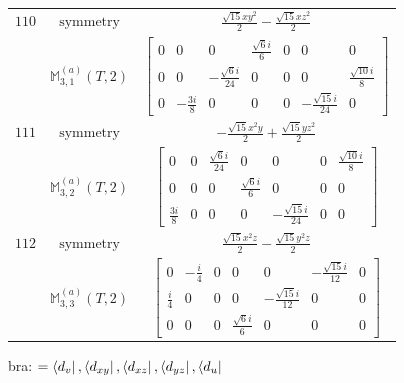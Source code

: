 \documentclass[fleqn,8pt,landscape]{jsarticle}
\begin{document}
\begin{longtable}{ccc}
$ 110 $ & $ \text{symmetry} $ & $ \frac{\sqrt{15} x y^{2}}{2} - \frac{\sqrt{15} x z^{2}}{2} $ \\
$  $ & $ \mathbb{M}_{3,1}^{(a)}(T,2) $ & $ \begin{bmatrix} 0 & 0 & 0 & \frac{\sqrt{6} i}{6} & 0 & 0 & 0 \\ 0 & 0 & - \frac{\sqrt{6} i}{24} & 0 & 0 & 0 & \frac{\sqrt{10} i}{8} \\ 0 & - \frac{3 i}{8} & 0 & 0 & 0 & - \frac{\sqrt{15} i}{24} & 0 \end{bmatrix} $ \\ \hline
$ 111 $ & $ \text{symmetry} $ & $ - \frac{\sqrt{15} x^{2} y}{2} + \frac{\sqrt{15} y z^{2}}{2} $ \\
$  $ & $ \mathbb{M}_{3,2}^{(a)}(T,2) $ & $ \begin{bmatrix} 0 & 0 & \frac{\sqrt{6} i}{24} & 0 & 0 & 0 & \frac{\sqrt{10} i}{8} \\ 0 & 0 & 0 & \frac{\sqrt{6} i}{6} & 0 & 0 & 0 \\ \frac{3 i}{8} & 0 & 0 & 0 & - \frac{\sqrt{15} i}{24} & 0 & 0 \end{bmatrix} $ \\ \hline
$ 112 $ & $ \text{symmetry} $ & $ \frac{\sqrt{15} x^{2} z}{2} - \frac{\sqrt{15} y^{2} z}{2} $ \\
$  $ & $ \mathbb{M}_{3,3}^{(a)}(T,2) $ & $ \begin{bmatrix} 0 & - \frac{i}{4} & 0 & 0 & 0 & - \frac{\sqrt{15} i}{12} & 0 \\ \frac{i}{4} & 0 & 0 & 0 & - \frac{\sqrt{15} i}{12} & 0 & 0 \\ 0 & 0 & 0 & \frac{\sqrt{6} i}{6} & 0 & 0 & 0 \end{bmatrix} $ \\ \hline
\end{longtable}
bra: $=\bra{d_{v}}, \bra{d_{xy}}, \bra{d_{xz}}, \bra{d_{yz}}, \bra{d_{u}}$
\end{document}
